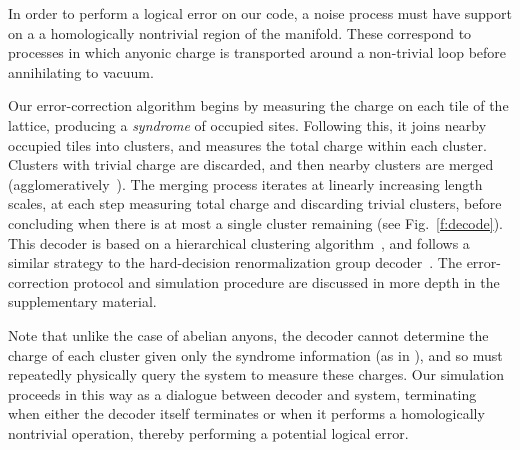 \documentclass[aps, prl, letterpaper, twocolumn, superscriptaddress, notitlepage, 10pt]{revtex4-1}
\newcommand{\Fref}[1]{Fig.~\ref{#1}}
\begin{document}
In order to perform a logical error on our code, a noise process must have support on a 
a homologically nontrivial region of the manifold.
These correspond to processes in which anyonic charge is transported around a non-trivial loop before 
annihilating to vacuum.

Our error-correction algorithm begins by measuring the charge on 
each tile of the lattice, producing a \emph{syndrome} 
of occupied sites. Following this, it joins nearby occupied tiles into clusters, and measures the total charge within each cluster.
Clusters with trivial charge are discarded, and then nearby clusters are merged (agglomeratively~\cite{Hastie2009}).
The merging process iterates at linearly increasing length scales, at each step measuring total charge and discarding trivial clusters, before concluding when 
there is at most a single cluster remaining (see \Fref{f:decode}).
This decoder is based on a hierarchical clustering algorithm~\cite{Hastie2009, Wootton2015b},
and follows a similar strategy to the hard-decision renormalization group decoder~\cite{Bravyi2011}. 
The error-correction protocol and simulation procedure are discussed in more depth in the supplementary material.

Note that unlike the case of abelian anyons, the decoder
cannot determine the charge of each cluster given only the syndrome information (as in \cite{Bravyi2011}),
and so must repeatedly physically query the system to measure these charges.
Our simulation proceeds in this way as a dialogue between decoder
and system, terminating when either the decoder itself terminates or 
when it performs a homologically nontrivial operation, thereby performing a potential logical error.
\end{document}
